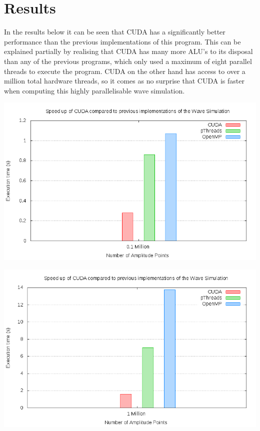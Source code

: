\documentclass[a4paper,12px]{article}
\begin{document}
\section{Results}

In the results below it can be seen that CUDA has a significantly better
performance than the previous implementations of this program. This can be
explained partially by realising that CUDA has many more ALU's to its disposal
than any of the previous programs, which only used a maximum of eight parallel
threads to execute the program. CUDA on the other hand has access to over a
million total hardware threads, so it comes as no surprise that CUDA is faster
when computing this highly parallelisable wave simulation.

\begin{center}
    \includegraphics[width=\textwidth]{speedup01mil}
\end{center}

\begin{center}
    \includegraphics[width=\textwidth]{speedup1mil}
\end{center}
\end{document}
